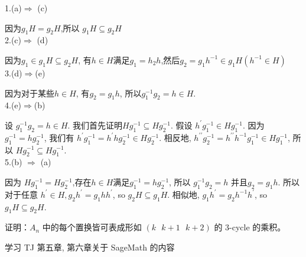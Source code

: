 \documentclass[a4paper, justified]{tufte-handout}
\begin{document}
\begin{problem}

\end{problem}

\begin{solution}
	1.(a)$\Rightarrow$ (c)

	因为$g_1H = g_2H$,所以 $g_1H \subseteq  g_2H$\\
	2.(c)$\Rightarrow$ (d)

	因为$g_1\in g_1H \subseteq g_2H$, 有$h\in H$满足$g_1=h_2h$,然后$g_2=g_1h^{-1}\in g_1H(h^{-1}\in H)$\\
	3.(d)$\Rightarrow$(e)

	因为对于某些$h \in H$, 有$g_2=g_1h$, 所以$g_1^{-1}g_2=h\in H$.\\
	4.(e)$\Rightarrow$(b)

	设 $g_1^{-1} g_2=h \in H$. 我们首先证明$H g_1^{-1} \subseteq H g_2^{-1}$. 假设 $h^{\prime} g_1^{-1} \in H g_1^{-1}$. 因为 $g_1^{-1}=h g_2^{-1}$, 我们有 $h^{\prime} g_1^{-1}=h^{\prime} h g_2^{-1} \in H g_2^{-1}$. 相反地, $h^{\prime \prime} g_2^{-1}=h^{\prime \prime} h^{-1} g_1^{-1} \in H g_1^{-1}$, 所以 $H g_2^{-1} \subseteq H g_1^{-1}$.\\
	5.(b) $\Rightarrow$ (a)

	因为 $H g_1^{-1}=H g_2^{-1}$,存在$h \in H$满足$g_1^{-1}=h g_2^{-1}$, 所以 $g_1^{-1} g_2=h$ 并且$g_2=g_1 h$. 所以对于任意 $h^{\prime} \in H, g_2 h^{\prime}=g_1 h h^{\prime}$, so $g_2 H \subseteq g_1 H$. 相似地, $g_1 h^{\prime}=g_2 h^{-1} h^{\prime}$, so $g_1 H \subseteq g_2 H$.
\end{solution}


\beginoptional

\begin{problem}[$3-cycle$]
证明：$A_n$ 中的每个置换皆可表成形如 $(k \text{ } k+1 \text{ } k+2)$ 的 3-cycle 的乘积。
\end{problem}

\begin{solution}
\end{solution}

\begin{problem}[SageMath学习]
学习 TJ 第五章, 第六章关于 SageMath 的内容
\end{problem}

\begin{solution}
\end{solution}
\end{document}
